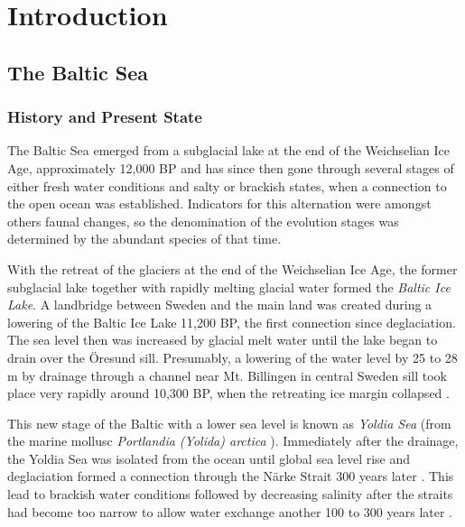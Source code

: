\chapter{Introduction}
\label{kap-einleitung}



\section{The Baltic Sea}

\subsection{History and Present State}

The Baltic Sea emerged from a subglacial lake at the end of the Weichselian Ice Age, approximately 12,000 BP and has since then gone through several stages of either fresh water conditions and salty or brackish states, when a connection to the open ocean was established. Indicators for this alternation were amongst others faunal changes, so the denomination of the evolution stages was determined by the abundant species of that time.

With the retreat of the glaciers at the end of the Weichselian Ice Age, the former subglacial lake together with rapidly melting glacial water formed the \textit{Baltic Ice Lake}. A landbridge between Sweden and the main land was created during a lowering of the Baltic Ice Lake 11,200 BP, the first connection since deglaciation. The sea level then was increased by glacial melt water until the lake began to drain over the Öresund sill. Presumably, a lowering of the water level by 25 to 28 m by drainage through a channel near Mt. Billingen in central Sweden sill took place very rapidly around 10,300 BP, when the retreating ice margin collapsed \citep[][]{bjoerk95,tikkanen2002}. 

This new stage of the Baltic with a lower sea level is known as \textit{Yoldia Sea} (from the marine mollusc \textit{Portlandia (Yolida) arctica} \citep[][]{schoning2001}). Immediately after the drainage, the Yoldia Sea was isolated from the ocean until global sea level rise and deglaciation formed a connection through the Närke Strait 300 years later \citep[][]{schoning2001}. This lead to brackish water conditions followed by decreasing salinity after the straits had become too narrow to allow water exchange another 100 to 300 years later \citep[][]{bjoerk95}.

